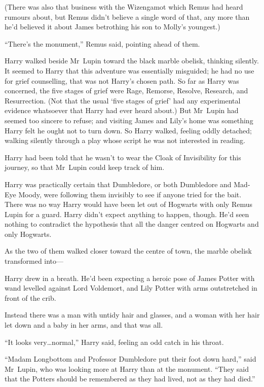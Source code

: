 (There was also that business with the Wizengamot which Remus had heard rumours about, but Remus didn’t believe a single word of that, any more than he’d believed it about James betrothing his son to Molly’s youngest.)

“There’s the monument,” Remus said, pointing ahead of them.

\later

Harry walked beside Mr~Lupin toward the black marble obelisk, thinking silently. It seemed to Harry that this adventure was essentially misguided; he had no use for grief counselling, that was not Harry’s chosen path. So far as Harry was concerned, the five stages of grief were Rage, Remorse, Resolve, Research, and Resurrection. (Not that the usual ‘five stages of grief’ had any experimental evidence whatsoever that Harry had ever heard about.) But Mr~Lupin had seemed too sincere to refuse; and visiting James and Lily’s home was something Harry felt he ought not to turn down. So Harry walked, feeling oddly detached; walking silently through a play whose script he was not interested in reading.

Harry had been told that he wasn’t to wear the Cloak of Invisibility for this journey, so that Mr~Lupin could keep track of him.

Harry was practically certain that Dumbledore, or both Dumbledore and Mad-Eye Moody, were following them invisibly to see if anyone tried for the bait. There was no way Harry would have been let out of Hogwarts with only Remus Lupin for a guard. Harry didn’t expect anything to happen, though. He’d seen nothing to contradict the hypothesis that all the danger centred on Hogwarts and only Hogwarts.

As the two of them walked closer toward the centre of town, the marble obelisk transformed into—

Harry drew in a breath. He’d been expecting a heroic pose of James Potter with wand levelled against Lord Voldemort, and Lily Potter with arms outstretched in front of the crib.

Instead there was a man with untidy hair and glasses, and a woman with her hair let down and a baby in her arms, and that was all.

“It looks very…normal,” Harry said, feeling an odd catch in his throat.

“Madam Longbottom and Professor Dumbledore put their foot down hard,” said Mr~Lupin, who was looking more at Harry than at the monument. “They said that the Potters should be remembered as they had lived, not as they had died.”

